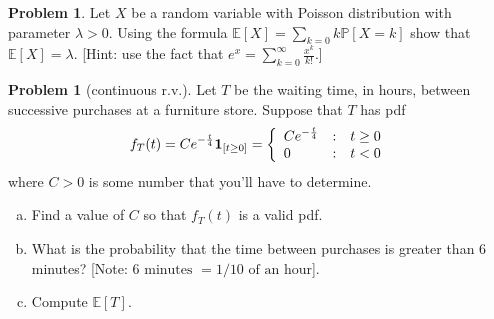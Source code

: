 \documentclass[10pt]{article}
\theoremstyle{definition}
\newtheorem{problem}[theorem]{Problem}
\newcommand{\1}[1]{\textbf{1}_{\left[#1\right]}} %
\def\E{\mathbb{E}} %
\def\P{\mathbb{P}} %
\def\Var{\mathrm{Var}} %
\begin{document}
\begin{problem}
  Let $X$ be a random variable with Poisson distribution with parameter
  $\lambda>0$. Using the formula
  $\E\left[X \right] = \sum_{k=0}k \P\left[X=k \right]$ show that $\E\left[X
  \right] =\lambda$. [Hint: use the fact that $e^{x}=\sum_{k=0}^{\infty}\frac{x^{k}}{k!}$.]
    
\end{problem}


\begin{problem}[continuous r.v.]
  Let $T$ be the waiting time, in hours, between successive purchases at a
  furniture store. Suppose that $T$ has pdf
  \begin{equation*}
    f_{T}(t) = C e^{-\frac{t}{4}}\mathbf{1}_{\left[ t \geq 0\right] } = \left\{ \begin{array}{l@{\quad:\quad}l} Ce^{-\frac{t}{4}} & t \geq 0\\ 0& t<0\end{array}\right.
  \end{equation*}
  where $C>0$ is some number that you'll have to determine.
  \begin{enumerate}[(a)]
    \item Find a value of $C$ so that $f_{T}(t)$ is a valid pdf.
    \item What is the probability that the time between purchases is greater
    than $6$ minutes? [Note: $6\text{ minutes }= 1/10\text{ of an hour}$].
    \item Compute $\E\left[T \right]$.
  \end{enumerate}
\end{problem}
\end{document}
